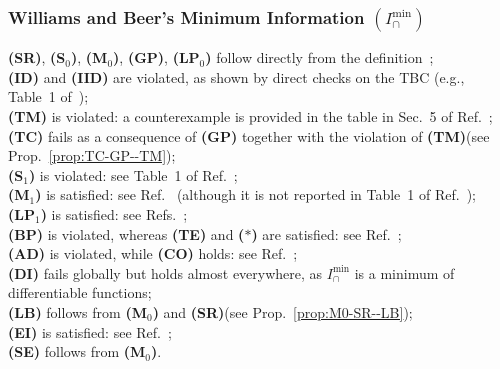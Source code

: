 \documentclass{article}
\newcommand{\ts}[1]{\ensuremath{_{\text{#1}}}}
\newcommand{\SR}{\textbf{(SR)}\xspace} %
\newcommand{\Sz}{\textbf{(S\ts{0})}\xspace} %
\newcommand{\Mz}{\textbf{(M\ts{0})}\xspace} %
\newcommand{\GP}{\textbf{(GP)}\xspace} %
\newcommand{\LPz}{\textbf{(LP\ts{0})}\xspace} %
\newcommand{\ID}{\textbf{(ID)}\xspace} %
\newcommand{\IID}{\textbf{(IID)}\xspace} %
\newcommand{\TM}{\textbf{(TM)}\xspace} %
\newcommand{\TC}{\textbf{(TC)}\xspace} %
\newcommand{\So}{\textbf{(S\ts{1})}\xspace} %
\newcommand{\Mo}{\textbf{(M\ts{1})}\xspace} %
\newcommand{\LPo}{\textbf{(LP\ts{1})}\xspace} %
\newcommand{\BP}{\textbf{(BP)}\xspace} %
\newcommand{\TE}{\textbf{(TE)}\xspace} %
\newcommand{\AST}{\textbf{($\boldsymbol{\ast}$)}\xspace} %
\newcommand{\AD}{\textbf{(AD)}\xspace} %
\newcommand{\CO}{\textbf{(CO)}\xspace} %
\newcommand{\LB}{\textbf{(LB)}\xspace} %
\newcommand{\EI}{\textbf{(EI)}\xspace} %
\newcommand{\SE}{\textbf{(SE)}\xspace} %
\newcommand{\DI}{\textbf{(DI)}\xspace}
\newcommand{\Imin}{\ensuremath{I_\cap^{\text{min}}}\xspace}
\begin{document}
\subsubsection*{Williams and Beer's Minimum Information $(\Imin)$}
    \SR, \Sz, \Mz, \GP, \LPz follow directly from the definition~\cite{williams2010nonnegative}; \\
    \ID and \IID are violated, as shown by direct checks on the TBC (e.g., Table~1 of~\cite{harder2013bivariate}); \\
    \TM is violated: a counterexample is provided in the table in Sec.~5 of Ref.~\cite{bertschinger2013shared}; \\
    \TC fails as a consequence of \GP together with the violation of \TM (see Prop.~\ref{prop:TC-GP--TM}); \\
    \So is violated: see Table~1 of Ref.~\cite{griffith2014intersection}; \\
    \Mo is satisfied: see Ref.~\cite{griffith2015quantifying} (although it is not reported in Table~1 of Ref.~\cite{griffith2014intersection}); \\
    \LPo is satisfied: see Refs.~\cite{williams2010nonnegative, griffith2014intersection}; \\
    \BP is violated, whereas \TE and \AST are satisfied: see Ref.~\cite{kolchinsky2022novel}; \\
    \AD is violated, while \CO holds: see Ref.~\cite{rauh2023continuity}; \\
    \DI fails globally but holds almost everywhere, as \Imin is a minimum of differentiable functions; \\  
    \LB follows from \Mz and \SR (see Prop.~\ref{prop:M0-SR--LB}); \\
    \EI is satisfied: see Ref.~\cite{griffith2014intersection}; \\
    \SE follows from \Mz.
    
\end{document}
